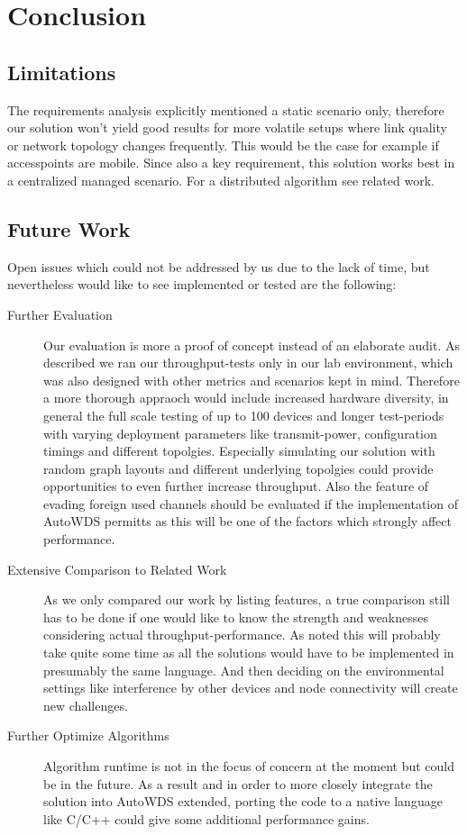 \chapter{Conclusion}
  
  \section{Limitations}
    The requirements analysis explicitly mentioned a static scenario only, therefore our solution won't yield good 
    results for more volatile setups where link quality or network topology
    changes frequently. This would be the case for example if accesspoints are mobile.
    Since also a key requirement, this solution works best in a centralized managed scenario. 
    For a distributed algorithm see related work.
  \section{Future Work}
    Open issues which could not be addressed by us due to the lack of time, but nevertheless would like 
    to see implemented or tested are the following:
    \begin{description}
      \item [Further Evaluation]
	Our evaluation is more a proof of concept instead of an elaborate audit. As described we ran our throughput-tests only in our lab environment, 
	which was also designed with other metrics and scenarios kept in mind. Therefore a more thorough appraoch would include increased hardware diversity, 
	in general the full scale testing of up to 100 devices and longer test-periods with varying deployment parameters like transmit-power, 
	configuration timings and different topolgies.
	Especially simulating our solution with random graph layouts and different underlying topolgies could provide opportunities to even further increase throughput.
	Also the feature of evading foreign used channels should be evaluated if the implementation of 
	AutoWDS permitts as this will be one of the factors which strongly affect performance.
      \item[Extensive Comparison to Related Work]
	As we only compared our work by listing features, a true comparison still has to be done if one would 
	like to know the strength and weaknesses considering actual throughput-performance.
	As noted this will probably take quite some time as all the solutions would have to be 
	implemented in presumably the same language. And then deciding on the environmental settings
	like interference by other devices and node connectivity will create new challenges.
      \item[Further Optimize Algorithms]
	Algorithm runtime is not in the focus of concern at the moment but could be in the future. 
	As a result and in order to more closely integrate the solution into AutoWDS extended,
	porting the code to a native language like C/C++ could give some additional performance gains.
    \end{description}